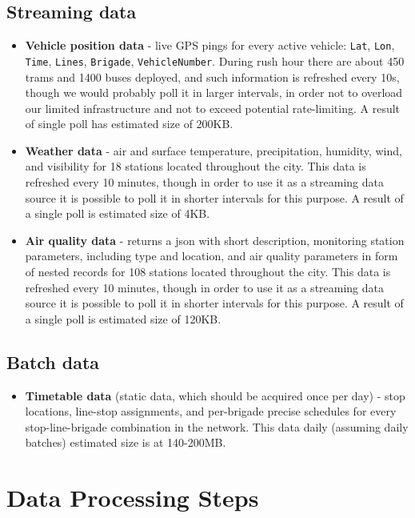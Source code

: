 \documentclass[11pt]{article}
\begin{document}
\subsection{Streaming data}
\begin{itemize}

  \item \textbf{Vehicle position data} - live GPS
    pings for every active vehicle: \texttt{Lat}, \texttt{Lon}, \texttt{Time},
    \texttt{Lines}, \texttt{Brigade}, \texttt{VehicleNumber}. During rush hour there are about 450 trams and 1400 buses deployed, and such information is refreshed every 10s, though we would probably poll it in larger intervals, in order not to overload our limited infrastructure and not to exceed potential rate-limiting. A result of single poll has estimated size of 200KB.
  \item \textbf{Weather data} - air and surface temperature,
    precipitation, humidity, wind, and visibility for 18 stations located throughout the city. This data is refreshed every 10 minutes, though in order to use it as a streaming data source it is possible to poll it in shorter intervals for this purpose. A result of a single poll is estimated size of 4KB.
     \item \textbf{Air quality data} - returns a json with short description, monitoring station parameters, including type and location, and air quality parameters in form of nested records for 108 stations located throughout the city. This data is refreshed every 10 minutes, though in order to use it as a streaming data source it is possible to poll it in shorter intervals for this purpose. A result of a single poll is estimated size of 120KB.
\end{itemize}
\subsection{Batch data}
\begin{itemize}
  \item  \textbf{Timetable data} (static data, which should be acquired once per day) -
    stop locations, line-stop assignments, and per-brigade precise schedules
    for every  stop-line-brigade combination in the network. This data daily (assuming daily batches) estimated size is at 140-200MB.
\end{itemize}

\section{Data Processing Steps}
\end{document}
